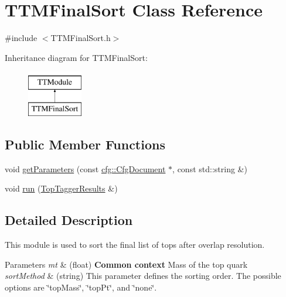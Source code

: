 \hypertarget{classTTMFinalSort}{\section{T\-T\-M\-Final\-Sort Class Reference}
\label{classTTMFinalSort}
}


{\ttfamily \#include $<$T\-T\-M\-Final\-Sort.\-h$>$}

Inheritance diagram for T\-T\-M\-Final\-Sort\-:\begin{figure}[H]
\begin{center}
\leavevmode
\includegraphics[height=2.000000cm]{classTTMFinalSort}
\end{center}
\end{figure}
\subsection*{Public Member Functions}
\begin{DoxyCompactItemize}
\item 
void \hyperlink{classTTMFinalSort_a1d26fb550c790fb08476c3d4eab99cfd}{get\-Parameters} (const \hyperlink{classcfg_1_1CfgDocument}{cfg\-::\-Cfg\-Document} $\ast$, const std\-::string \&)
\item 
void \hyperlink{classTTMFinalSort_ae4a9797de31364e116fe4b99c57c4afd}{run} (\hyperlink{classTopTaggerResults}{Top\-Tagger\-Results} \&)
\end{DoxyCompactItemize}


\subsection{Detailed Description}
This module is used to sort the final list of tops after overlap resolution.


\begin{DoxyParams}{Parameters}
{\em mt} & (float) {\bfseries  Common context } Mass of the top quark \\
\hline
{\em sort\-Method} & (string) This parameter defines the sorting order. The possible options are \char`\"{}top\-Mass\char`\"{}, \char`\"{}top\-Pt\char`\"{}, and \char`\"{}none\char`\"{}. \\
\hline
\end{DoxyParams}


